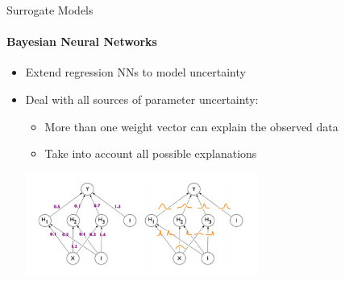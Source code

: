 \begin{frame}[c]{Surrogate Models}
\framesubtitle{Bayesian Neural Networks}

\begin{itemize}
    \item Extend regression NNs to model uncertainty
    \item Deal with all sources of parameter uncertainty: \pause
    \begin{itemize}
        \item More than one weight vector can explain the observed data 
        \item Take into account all possible explanations 
    \end{itemize}

\centering
\includegraphics[width=0.6\textwidth]{images/surrogate_models/bnn.jpg}

\end{itemize}


\end{frame}
%
%

